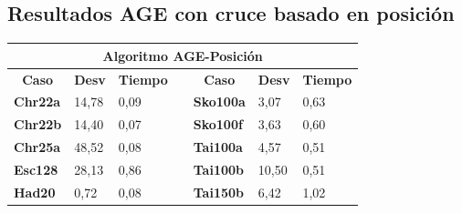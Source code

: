 \documentclass[a4paper, 12pt]{article}
\begin{document}
      \subsection{Resultados AGE con cruce basado en posición}
      \begin{table}[H]
\centering
\label{my-label}
\begin{tabular}{|l|l|l|l|l|l|l|}
\hline
\multicolumn{7}{|c|}{\textbf{Algoritmo AGE-Posición}}                                                                                                                                                                                                                   \\ \hline
\multicolumn{1}{|c|}{\textbf{Caso}} & \multicolumn{1}{c|}{\textbf{Desv}} & \multicolumn{1}{c|}{\textbf{Tiempo}} & \multicolumn{1}{c|}{\textbf{}} & \multicolumn{1}{c|}{\textbf{Caso}} & \multicolumn{1}{c|}{\textbf{Desv}} & \multicolumn{1}{c|}{\textbf{Tiempo}} \\ \cline{1-3} \cline{5-7} 
\textbf{Chr22a}                     & 14,78                              & 0,09                                 &                                & \textbf{Sko100a}                   & 3,07                               & 0,63                                 \\ \cline{1-3} \cline{5-7} 
\textbf{Chr22b}                     & 14,40                              & 0,07                                 &                                & \textbf{Sko100f}                   & 3,63                               & 0,60                                 \\ \cline{1-3} \cline{5-7} 
\textbf{Chr25a}                     & 48,52                              & 0,08                                 &                                & \textbf{Tai100a}                   & 4,57                               & 0,51                                 \\ \cline{1-3} \cline{5-7} 
\textbf{Esc128}                     & 28,13                              & 0,86                                 &                                & \textbf{Tai100b}                   & 10,50                              & 0,51                                 \\ \cline{1-3} \cline{5-7} 
\textbf{Had20}                      & 0,72                               & 0,08                                 &                                & \textbf{Tai150b}                   & 6,42                               & 1,02                                 \\ \cline{1-3} \cline{5-7} 

\end{tabular}
\end{table}
\end{document}

